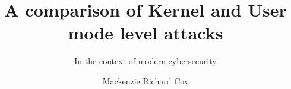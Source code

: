 \title{A comparison of Kernel and User mode level attacks}

\subtitle{In the context of modern cybersecurity}

\author{Mackenzie Richard Cox}








     



\renewcommand{\submissiontext}{This dissertation is submitted for the}




